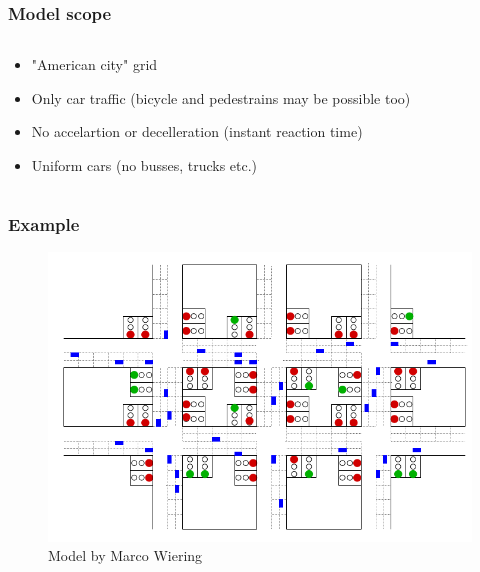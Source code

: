 \documentclass[11pt]{beamer}
\begin{document}
\begin{frame}
\frametitle{Model scope}
\begin{columns}
    \begin{column}{.5\textwidth}
        \begin{itemize}
            \item "American city" grid
            \item Only car traffic (bicycle and pedestrains may be possible too)
            \item No accelartion or decelleration (instant reaction time)
            \item Uniform cars (no busses, trucks etc.)
        \end{itemize}
    \end{column}
    \begin{column}{.5\textwidth}
    \end{column}
\end{columns}
\end{frame}

\begin{frame}
\frametitle{Example}

\begin{figure}
\centering
\includegraphics[width=.8\textwidth]{wieringmodel.png}
\caption{Model by Marco Wiering}
\end{figure}
  
\end{frame}
\end{document}

